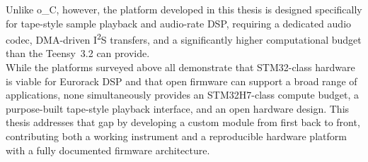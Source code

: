 Unlike o\_C, however, the platform developed in this thesis is designed specifically for tape-style sample playback and audio-rate DSP,
requiring a dedicated audio codec, DMA-driven I\textsuperscript{2}S transfers, and a significantly higher computational budget than the Teensy~3.2 can provide. \\

While the platforms surveyed above all demonstrate that STM32-class hardware is viable for Eurorack DSP and that open firmware can support a broad range of applications, none simultaneously provides an STM32H7-class compute budget, a purpose-built tape-style playback interface, and an open hardware design. 
This thesis addresses that gap by developing a custom module from first back to front, contributing both a working instrument and a reproducible hardware platform with a fully documented firmware architecture.